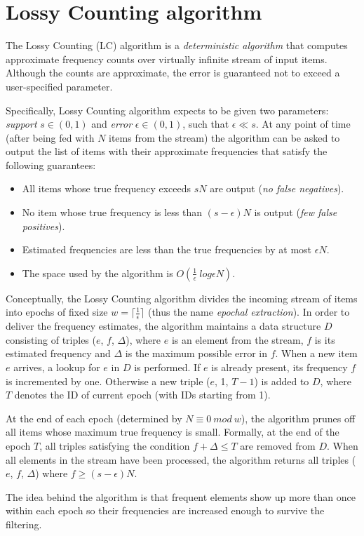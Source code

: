 \chapter{Lossy Counting algorithm}
\label{chap:lossy-counting}

The Lossy Counting (LC) algorithm \citep{manku:lossycounting} is a \emph{deterministic algorithm}
that computes approximate frequency counts over virtually infinite stream of input items.
Although the counts are approximate, the error is guaranteed not to exceed a user-specified parameter.

Specifically, Lossy Counting algorithm expects to be given two parameters:
\emph{support} $s \in (0,1)$ and \emph{error} $\epsilon \in (0,1)$, such that $\epsilon \ll s$.
At any point of time (after being fed with $N$ items from the stream) the algorithm can be
asked to output the list of items with their approximate frequencies that satisfy the following guarantees:
\begin{itemize}
 \item All items whose true frequency exceeds $sN$ are output (\emph{no false negatives}).
 \item No item whose true frequency is less than $(s - \epsilon)N$ is output (\emph{few false positives}).
 \item Estimated frequencies are less than the true frequencies by at most $\epsilon N$.
 \item The space used by the algorithm is $O(\frac{1}{\epsilon}~log \epsilon N)$.
\end{itemize}


Conceptually, the Lossy Counting algorithm divides the incoming stream of items
into epochs of fixed size $w = \lceil \frac{1}{\epsilon} \rceil$
(thus the name \emph{epochal extraction}).
In order to deliver the frequency estimates, the algorithm maintains a data structure $D$
consisting of triples ($e$, $f$, $\Delta$), where $e$ is an element from the
stream, $f$ is its estimated frequency and $\Delta$ is the maximum possible
error in $f$. When a new item $e$ arrives, a lookup for $e$ in $D$ is
performed. If $e$ is already present, its frequency $f$ is incremented by one.
Otherwise a new triple ($e$, 1, $T-1$) is added to $D$, where $T$ denotes the
ID of current epoch (with IDs starting from 1).

At the end of each epoch (determined by $N \equiv 0~mod~w$), the algorithm
prunes off all items whose maximum true frequency is small. Formally, at the end
of the epoch $T$, all triples satisfying the condition $f + \Delta \leq T$ are
removed from $D$. When all elements in the stream have been processed, the
algorithm returns all triples ($e$, $f$, $\Delta$) where $f \geq
(s-\epsilon)N$.

The idea behind the algorithm is that frequent elements show up more than once
within each epoch so their frequencies are increased enough to survive the
filtering.

